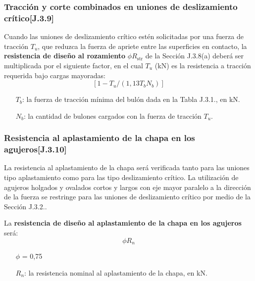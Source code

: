 \documentclass[twocolumn]{article}
\newcommand{\str}{\text{str}}
\begin{document}
\subsubsection{Tracción y corte combinados en uniones de deslizamiento crítico[J.3.9]}
Cuando las uniones de deslizamiento crítico estén solicitadas por una fuerza de tracción $T_u$, que reduzca la fuerza de apriete entre las superficies en contacto, la \textbf{resistencia de diseño al rozamiento} $\phi R_\str$ de la Sección J.3.8(a) deberá ser multiplicada por
el siguiente factor, en el cual $T_u$ (kN) es la resistencia a tracción requerida bajo cargas mayoradas:
\[
[1 - T_u /(1,13 T_b N_b)]
\]
\begin{itemize}
	\item[$T_b$:] la fuerza de tracción mínima del bulón dada en la Tabla J.3.1., en kN.
	\item[$N_b$:] la cantidad de bulones cargados con la fuerza de tracción $T_u$.
\end{itemize}

\subsubsection{Resistencia al aplastamiento de la chapa en los agujeros[J.3.10]}
La resistencia al aplastamiento de la chapa será verificada tanto para las uniones tipo aplastamiento como para las tipo deslizamiento crítico. La utilización de agujeros holgados y ovalados cortos y largos con eje mayor paralelo a la dirección de la fuerza se restringe para las uniones de deslizamiento crítico por medio de la Sección J.3.2..

La \textbf{resistencia de diseño al aplastamiento de la chapa en los agujeros} será:
\[
\phi R_n
\]

\begin{itemize}
	\item[$\phi$] = 0,75
	\item[$R_n$:] la resistencia nominal al aplastamiento de la chapa, en kN.
\end{itemize}
\end{document}
